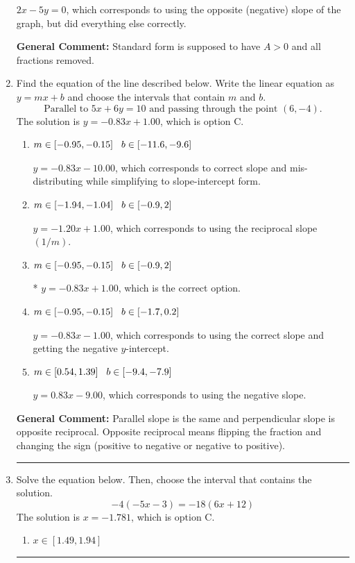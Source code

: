 \documentclass{extbook}[14pt]
\newcommand{\litem}[1]{\item #1

\rule{\textwidth}{0.4pt}}
\begin{document}
\begin{enumerate}
{\begin{enumerate}[label=\Alph*.]
 $2x - 5y = 0$, which corresponds to using the opposite (negative) slope of the graph, but did everything else correctly.
\end{enumerate}

\textbf{General Comment:} Standard form is supposed to have $A > 0$ and all fractions removed.
}
\litem{
Find the equation of the line described below. Write the linear equation as $ y=mx+b $ and choose the intervals that contain $m$ and $b$.
\[ \text{Parallel to } 5 x + 6 y = 10 \text{ and passing through the point } (6, -4). \]The solution is \( y = -0.83x + 1.00 \), which is option C.\begin{enumerate}[label=\Alph*.]
\item \( m \in [-0.95, -0.15] \hspace*{3mm} b \in [-11.6, -9.6] \)

 $y = -0.83x - 10.00$, which corresponds to correct slope and mis-distributing while simplifying to slope-intercept form.
\item \( m \in [-1.94, -1.04] \hspace*{3mm} b \in [-0.9, 2] \)

 $y = -1.20x + 1.00$, which corresponds to using the reciprocal slope $(1/m)$.
\item \( m \in [-0.95, -0.15] \hspace*{3mm} b \in [-0.9, 2] \)

* $y = -0.83x + 1.00$, which is the correct option.
\item \( m \in [-0.95, -0.15] \hspace*{3mm} b \in [-1.7, 0.2] \)

 $y = -0.83x - 1.00$, which corresponds to using the correct slope and getting the negative $y$-intercept.
\item \( m \in [0.54, 1.39] \hspace*{3mm} b \in [-9.4, -7.9] \)

 $y = 0.83x - 9.00$, which corresponds to using the negative slope.
\end{enumerate}

\textbf{General Comment:} Parallel slope is the same and perpendicular slope is opposite reciprocal. Opposite reciprocal means flipping the fraction and changing the sign (positive to negative or negative to positive).
}
\litem{
Solve the equation below. Then, choose the interval that contains the solution.
\[ -4(-5x -3) = -18(6x + 12) \]The solution is \( x = -1.781 \), which is option C.\begin{enumerate}[label=\Alph*.]
\item \( x \in [1.49, 1.94] \)


\end{enumerate}}
\end{enumerate}
\end{document}
